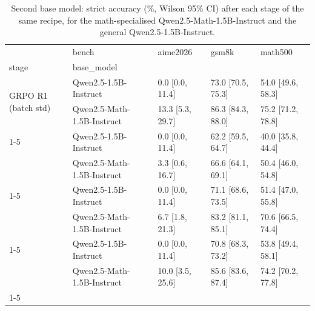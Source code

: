 \begin{table}
\caption{Second base model: strict accuracy (\%, Wilson 95\% CI) after each stage of the same recipe, for the math-specialised Qwen2.5-Math-1.5B-Instruct and the general Qwen2.5-1.5B-Instruct.}
\label{tab:second_model}
\begin{tabular}{lllll}
\toprule
 & bench & aime2026 & gsm8k & math500 \\
stage & base_model &  &  &  \\
\midrule
\multirow[t]{2}{*}{GRPO R1 (batch std)} & Qwen2.5-1.5B-Instruct & 0.0 [0.0, 11.4] & 73.0 [70.5, 75.3] & 54.0 [49.6, 58.3] \\
 & Qwen2.5-Math-1.5B-Instruct & 13.3 [5.3, 29.7] & 86.3 [84.3, 88.0] & 75.2 [71.2, 78.8] \\
\cline{1-5}
\multirow[t]{2}{*}{GRPO R1 (group std)} & Qwen2.5-1.5B-Instruct & 0.0 [0.0, 11.4] & 62.2 [59.5, 64.7] & 40.0 [35.8, 44.4] \\
 & Qwen2.5-Math-1.5B-Instruct & 3.3 [0.6, 16.7] & 66.6 [64.1, 69.1] & 50.4 [46.0, 54.8] \\
\cline{1-5}
\multirow[t]{2}{*}{SFT} & Qwen2.5-1.5B-Instruct & 0.0 [0.0, 11.4] & 71.1 [68.6, 73.5] & 51.4 [47.0, 55.8] \\
 & Qwen2.5-Math-1.5B-Instruct & 6.7 [1.8, 21.3] & 83.2 [81.1, 85.1] & 70.6 [66.5, 74.4] \\
\cline{1-5}
\multirow[t]{2}{*}{base} & Qwen2.5-1.5B-Instruct & 0.0 [0.0, 11.4] & 70.8 [68.3, 73.2] & 53.8 [49.4, 58.1] \\
 & Qwen2.5-Math-1.5B-Instruct & 10.0 [3.5, 25.6] & 85.6 [83.6, 87.4] & 74.2 [70.2, 77.8] \\
\cline{1-5}
\bottomrule
\end{tabular}
\end{table}
